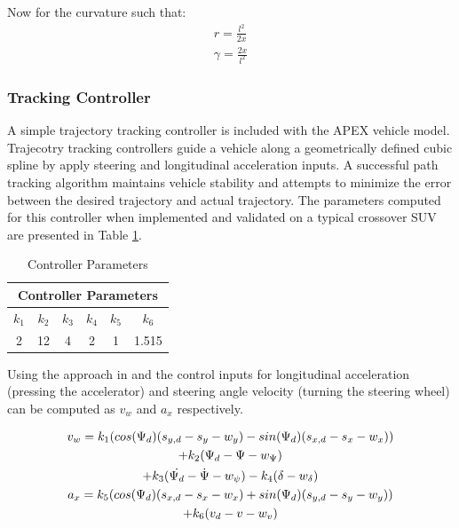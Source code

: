 \documentclass{easychair}
\theoremstyle{theorem}
\theoremstyle{remark}
\begin{document}
\noindent Now for the curvature such that:
\begin{align}
r=\frac{l^2}{2x}\\
\gamma=\frac{2x}{l^2}
\end{align}

\subsubsection{Tracking Controller}
A simple trajectory tracking controller is included with the APEX vehicle model. Trajecotry tracking controllers guide a vehicle along a geometrically defined cubic spline by apply steering and longitudinal acceleration inputs. A successful path tracking algorithm maintains vehicle stability and attempts to minimize the error between the desired trajectory and actual trajectory. The parameters computed for this controller when implemented and validated on a typical crossover SUV \cite{Althoff2014} are presented in Table \ref{table:controller}. 

\begin{table}[h]
	\centering
	\caption{Controller Parameters \cite{Althoff2014}}
	\label{table:controller}
	\begin{tabular}{|c|c|c|c|c|c|}
		\hline
		\multicolumn{6}{|c|}{Controller Parameters} \\ \hline
		$k_1$ & $k_2$ & $k_3$ & $k_4$ & $k_5$ & $k_6$ \\ \hline
		2 & 12 & 4 & 2 & 1 & 1.515 \\ \hline
	\end{tabular}	
\end{table}

Using the approach in \cite{Snider2009} and \cite{Althoff2014} the control inputs for longitudinal acceleration (pressing the accelerator) and steering angle velocity (turning the steering wheel) can be computed as $v_w$ and $a_x$ respectively. 

\begin{gather}
v_w=k_1(cos{(\Psi_d)}(s_{y,d}-s_y-w_y)-sin{(\Psi_d)}(s_{x,d}-s_x-w_x)) \notag \\ +k_2(\Psi_d-\Psi-w_{\Psi}) \notag \\ +k_3(\dot{\Psi_d}-\dot{\Psi}-w_{\psi})-k_4(\delta-w_{\delta})
\\
a_x=k_5(cos{(\Psi_d)}(s_{x,d}-s_x-w_x)+sin{(\Psi_d)}(s_{y,d}-s_y-w_y)) \notag \\ +k_6(v_d-v-w_v)
\end{gather}

\end{document}
